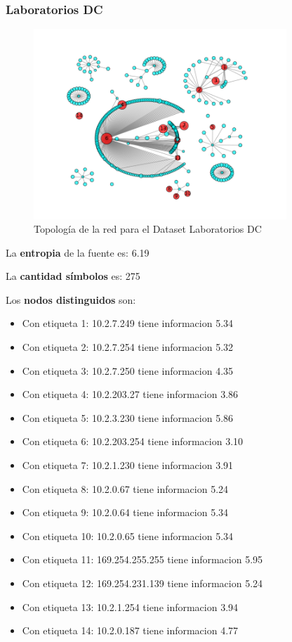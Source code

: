 \subsubsection{Laboratorios DC}

\begin{figure}[H]
    \centering
    \includegraphics[width=0.85\textwidth]{imagenes/labosDC.png}
    \caption{Topología de la red para el Dataset Laboratorios DC}
\end{figure}

La \textbf{entropia} de la fuente es: 6.19

La \textbf{cantidad símbolos} es: 275

Los \textbf{nodos distinguidos} son:

\begin{itemize}
    \item Con etiqueta 1: 10.2.7.249 tiene informacion 5.34
    \item Con etiqueta 2: 10.2.7.254 tiene informacion 5.32
    \item Con etiqueta 3: 10.2.7.250 tiene informacion 4.35
    \item Con etiqueta 4: 10.2.203.27 tiene informacion 3.86
    \item Con etiqueta 5: 10.2.3.230 tiene informacion 5.86
    \item Con etiqueta 6: 10.2.203.254 tiene informacion 3.10
    \item Con etiqueta 7: 10.2.1.230 tiene informacion 3.91
    \item Con etiqueta 8: 10.2.0.67 tiene informacion 5.24
    \item Con etiqueta 9: 10.2.0.64 tiene informacion 5.34
    \item Con etiqueta 10: 10.2.0.65 tiene informacion 5.34
    \item Con etiqueta 11: 169.254.255.255 tiene informacion 5.95
    \item Con etiqueta 12: 169.254.231.139 tiene informacion 5.24
    \item Con etiqueta 13: 10.2.1.254 tiene informacion 3.94
    \item Con etiqueta 14: 10.2.0.187 tiene informacion 4.77
\end{itemize}


